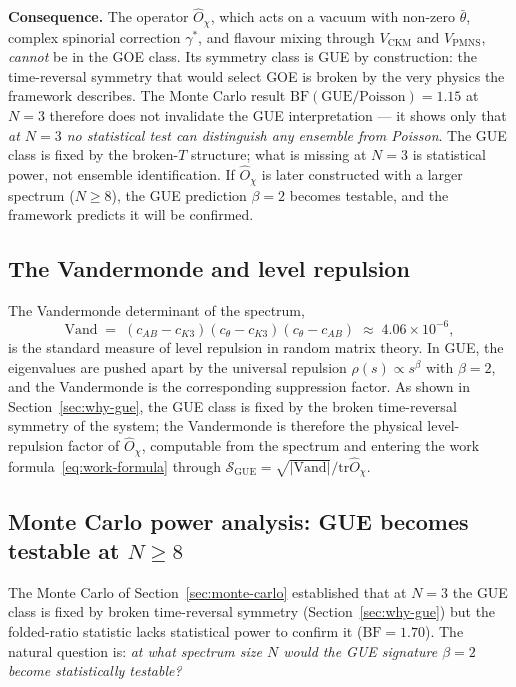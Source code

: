 \documentclass[11pt,a4paper]{article}
\newcommand{\Opchi}{\hat{O}_\chi}
\providecommand{\tr}{}
\renewcommand{\tr}{\mathrm{tr}}
\theoremstyle{plain}
\theoremstyle{definition}
\theoremstyle{remark}
\begin{document}
\medskip\noindent
\textbf{Consequence.}  The operator $\Opchi$, which acts on a
vacuum with non-zero $\bar\theta$, complex spinorial correction
$\gamma^\ast$, and flavour mixing through $V_{\mathrm{CKM}}$ and
$V_{\mathrm{PMNS}}$, \emph{cannot} be in the GOE class.  Its
symmetry class is GUE by construction: the time-reversal
symmetry that would select GOE is broken by the very physics the
framework describes.  The Monte Carlo result
$\mathrm{BF}(\text{GUE}/\text{Poisson}) = 1.15$ at $N=3$ therefore
does not invalidate the GUE interpretation --- it shows only that
\emph{at $N=3$ no statistical test can distinguish any ensemble
from Poisson}.  The GUE class is fixed by the broken-$T$ structure;
what is missing at $N=3$ is statistical power, not ensemble
identification.  If $\Opchi$ is later constructed with a larger
spectrum ($N \ge 8$), the GUE prediction $\beta = 2$ becomes
testable, and the framework predicts it will be confirmed.

\subsection{The Vandermonde and level repulsion}

The Vandermonde determinant of the spectrum,
\begin{equation}
  \mathrm{Vand}
  \;=\; (c_{AB} - c_{K3})(c_\theta - c_{K3})(c_\theta - c_{AB})
  \;\approx\; 4.06 \times 10^{-6},
\end{equation}
is the standard measure of level repulsion in random matrix theory.
In GUE, the eigenvalues are pushed apart by the universal repulsion
$\rho(s) \propto s^\beta$ with $\beta = 2$, and the Vandermonde is
the corresponding suppression factor.  As shown in
Section~\ref{sec:why-gue}, the GUE class is fixed by the broken
time-reversal symmetry of the system; the Vandermonde is therefore
the physical level-repulsion factor of $\Opchi$, computable from
the spectrum and entering the work formula~\eqref{eq:work-formula}
through $\mathcal{S}_{\mathrm{GUE}} = \sqrt{|\mathrm{Vand}|}/\tr\Opchi$.

\subsection{Monte Carlo power analysis: GUE becomes testable at
\texorpdfstring{$N \ge 8$}{N >= 8}}
\label{sec:high-N}

The Monte Carlo of Section~\ref{sec:monte-carlo} established that
at $N=3$ the GUE class is fixed by broken time-reversal symmetry
(Section~\ref{sec:why-gue}) but the folded-ratio statistic lacks
statistical power to confirm it ($\mathrm{BF} = 1.70$).  The
natural question is: \emph{at what spectrum size $N$ would the GUE
signature $\beta = 2$ become statistically testable?}
\end{document}
